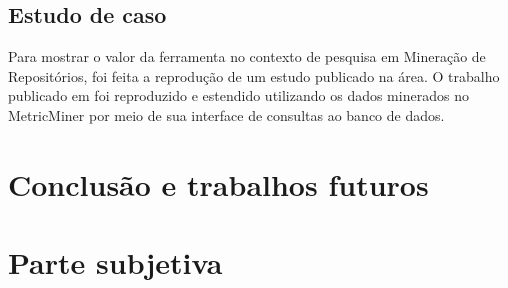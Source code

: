 \documentclass[a4paper, 12pt, twoside]{book}
\begin{document}
    \section{Estudo de caso} \label{sc:estudo-caso}
        Para mostrar o valor da ferramenta no contexto de pesquisa em Mineração de Repositórios, foi feita a reprodução de um estudo publicado na área. O trabalho publicado em \cite{SoetensQUATIC2010} foi reproduzido e estendido utilizando os dados minerados no MetricMiner por meio de sua interface de consultas ao banco de dados.

\chapter{Conclusão e trabalhos futuros} \label{ch:conclusao}

\chapter{Parte subjetiva} \label{ch:subjetiva}



\end{document}
